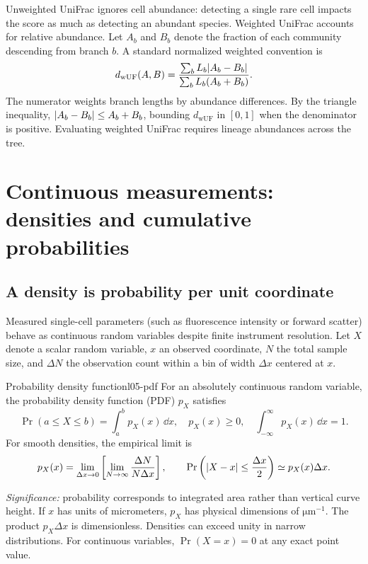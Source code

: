 Unweighted UniFrac ignores cell abundance: detecting a single rare cell impacts the score as much as detecting an abundant species. Weighted UniFrac accounts for relative abundance. Let $A_b$ and $B_b$ denote the fraction of each community descending from branch $b$. A standard normalized weighted convention is
\begin{equation}
d_{\mathrm{wUF}}(A,B)=
\frac{\sum_b L_b\lvert A_b-B_b\rvert}
     {\sum_b L_b(A_b+B_b)}.
\label{eq:l05-weighted-unifrac}
\end{equation}
The numerator weights branch lengths by abundance differences. By the triangle inequality, $\lvert A_b-B_b\rvert\leq A_b+B_b$, bounding $d_{\mathrm{wUF}}$ in $[0, 1]$ when the denominator is positive. Evaluating weighted UniFrac requires lineage abundances across the tree.

\section{Continuous measurements: densities and cumulative probabilities}
\label{sec:l05-pdf}
\subsection{A density is probability per unit coordinate}
\label{subsec:l05-density}
Measured single-cell parameters (such as fluorescence intensity or forward scatter) behave as continuous random variables despite finite instrument resolution. Let $X$ denote a scalar random variable, $x$ an observed coordinate, $N$ the total sample size, and $\Delta N$ the observation count within a bin of width $\Delta x$ centered at $x$.
\begin{definition}{Probability density function}{l05-pdf}
For an absolutely continuous random variable, the probability density function (PDF) $p_X$ satisfies
\begin{equation}
\Pr(a\leq X\leq b)=\int_a^b p_X(x)\,\dd x,
\quad p_X(x)\geq0,\quad \int_{-\infty}^{\infty}p_X(x)\,\dd x=1.
\label{eq:l05-density-definition}
\end{equation}
For smooth densities, the empirical limit is
\begin{equation}
p_X(x)=\lim_{\Delta x\to0}\left[
\lim_{N\to\infty}\frac{\Delta N}{N\Delta x}\right],
\qquad \Pr\left(\lvert X-x\rvert\leq\frac{\Delta x}{2}\right)
\simeq p_X(x)\Delta x.
\label{eq:l05-density-limit}
\end{equation}
\end{definition}
\textit{Significance:} probability corresponds to integrated area rather than vertical curve height. If $x$ has units of micrometers, $p_X$ has physical dimensions of $\si{\micro\metre}^{-1}$. The product $p_X\Delta x$ is dimensionless. Densities can exceed unity in narrow distributions. For continuous variables, $\Pr(X=x)=0$ at any exact point value.

